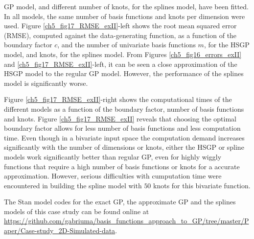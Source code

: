 \documentclass[onecolumn,a4paper,11pt]{article}
\begin{document}
GP model, and different number of knots, for the splines model, have been fitted. In all models, the same number of basis functions and knots per dimension were used. Figure \ref{ch5_fig17_RMSE_exII}-left shows the root mean squared error (RMSE), computed against the data-generating function, as a function of the boundary factor $c$, and the number of univariate basis functions $m$, for the HSGP model, and knots, for the splines model. From Figures \ref{ch5_fig16_errors_exII} and \ref{ch5_fig17_RMSE_exII}-left, it can be seen a close approximation of the HSGP model to the regular GP model. However, the performance of the splines model is significantly worse. 

Figure \ref{ch5_fig17_RMSE_exII}-right shows the computational times of the different models as a function of the boundary factor, number of basis functions and knots. Figure \ref{ch5_fig17_RMSE_exII} reveals that choosing the optimal boundary factor allows for less number of basis functions and less computation time. Even though in a bivariate input space the computation demand increases significantly with the number of dimensions or knots, either the HSGP or spline models work significantly better than regular GP, even for highly wiggly functions that require a high number of basis functions or knots for a accurate approximation. However, serious difficulties with cumputation time were encountered in building the spline model with $50$ knots for this bivariate function.

The Stan model codes for the exact GP, the approximate GP and the splines models of this case study can be found online at {\small \url{https://github.com/gabriuma/basis_functions_approach_to_GP/tree/master/Paper/Case-study_2D-Simulated-data}}.
\end{document}
